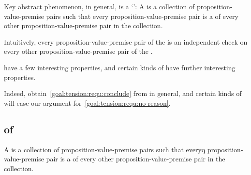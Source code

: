 \begin{note}
  Key abstract phenomenon, in general, is a `\cluster{}':
  A  is a collection of proposition-value-premise pairs such that every proposition-value-premise pair is a \requ{} of every other proposition-value-premise pair in the collection.

  Intuitively, every proposition-value-premise pair of the  is an independent check on every other proposition-value-premise pair of the .

   have a few interesting properties, and certain kinds of  have further interesting properties.

  Indeed, obtain~\autoref{goal:tension:requ:conclude} from  in general, and certain kinds of  will ease our argument for~\autoref{goal:tension:requ:no-reason}.
\end{note}


\subsection{ of }
\label{sec:cluster3}

\begin{note}
  A  is a collection of proposition-value-premise pairs such that everyq proposition-value-premise pair is a \requ{} of every other proposition-value-premise pair in the collection.
\end{note}

